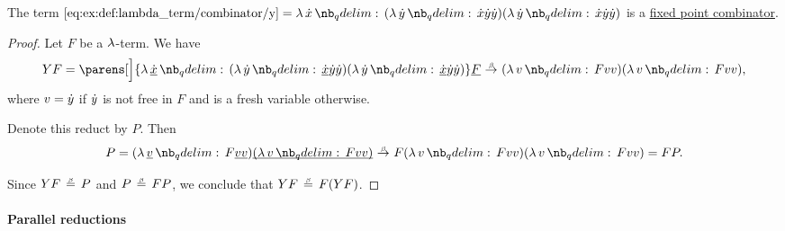 \begin{proposition}\label{thm:y_is_a_fixed_point_combinator}
  The term \( \ref{eq:ex:def:lambda_term/combinator/y} = \qabs \synx (\qabs \syny \synx \syny \syny) (\qabs \syny \synx \syny \syny) \) is a \hyperref[def:fixed_point_combinator]{fixed point combinator}.
\end{proposition}
\begin{proof}
  Let \( F \) be a \( \mathrm{\lambda} \)-term. We have
  \begin{equation*}
    YF
    =
    \parens[\Big]{ \qabs {\hi{\synx}} (\qabs \syny \hi{\synx} \syny \syny) (\qabs \syny \hi{\synx} \syny \syny) } \hi{F}
    \bred
    (\qabs v F v v) (\qabs v F v v),
  \end{equation*}
  where \( v = {\dot{y}} \) if \( {\dot{y}} \) is not free in \( F \) and is a fresh variable otherwise.

  Denote this reduct by \( P \). Then
  \begin{equation*}
    P =
    (\qabs {\hi{v}} F \hi{v} \hi{v}) \hi{(\qabs v F v v)}
    \bred
    F (\qabs v F v v) (\qabs v F v v)
    =
    FP.
  \end{equation*}

  Since \( YF \bequiv P \) and \( P \bequiv FP \), we conclude that \( YF \bequiv F(YF) \).
\end{proof}

\paragraph{Parallel reductions}

